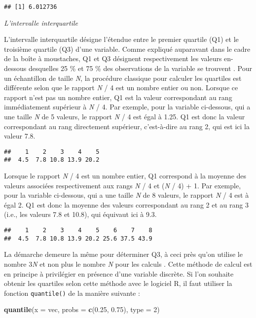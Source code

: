 \documentclass[
  french,
]{book}
\newenvironment{Shaded}{\begin{snugshade}}{\end{snugshade}}
\newcommand{\DataTypeTok}[1]{\textcolor[rgb]{0.13,0.29,0.53}{#1}}
\newcommand{\DecValTok}[1]{\textcolor[rgb]{0.00,0.00,0.81}{#1}}
\newcommand{\FloatTok}[1]{\textcolor[rgb]{0.00,0.00,0.81}{#1}}
\newcommand{\KeywordTok}[1]{\textcolor[rgb]{0.13,0.29,0.53}{\textbf{#1}}}
\newcommand{\NormalTok}[1]{#1}
\begin{document}
\begin{verbatim}
## [1] 6.012736
\end{verbatim}

\emph{L'intervalle interquartile}

L'intervalle interquartile désigne l'étendue entre le premier quartile (Q1) et le troisième quartile (Q3) d'une variable. Comme expliqué auparavant dans le cadre de la boîte à moustaches, Q1 et Q3 désignent respectivement les valeurs en-dessous desquelles 25 \% et 75 \% des observations de la variable se trouvent \autocite{chatellierMoyenneMedianeLeurs2003}. Pour un échantillon de taille \emph{N}, la procédure classique pour calculer les quartiles est différente selon que le rapport \emph{N} / 4 est un nombre entier ou non. Lorsque ce rapport n'est pas un nombre entier, Q1 est la valeur correspondant au rang immédiatement supérieur à \emph{N} / 4. Par exemple, pour la variable ci-dessous, qui a une taille \emph{N} de 5 valeurs, le rapport \emph{N} / 4 est égal à 1.25. Q1 est donc la valeur correspondant au rang directement supérieur, c'est-à-dire au rang 2, qui est ici la valeur 7.8.

\begin{verbatim}
##    1    2    3    4    5 
##  4.5  7.8 10.8 13.9 20.2
\end{verbatim}

Lorsque le rapport \emph{N} / 4 est un nombre entier, Q1 correspond à la moyenne des valeurs associées respectivement aux rangs \emph{N} / 4 et (\emph{N} / 4) + 1. Par exemple, pour la variable ci-dessous, qui a une taille \emph{N} de 8 valeurs, le rapport \emph{N} / 4 est à égal 2. Q1 est donc la moyenne des valeurs correspondant au rang 2 et au rang 3 (i.e., les valeurs 7.8 et 10.8), qui équivaut ici à 9.3.

\begin{verbatim}
##    1    2    3    4    5    6    7    8 
##  4.5  7.8 10.8 13.9 20.2 25.6 37.5 43.9
\end{verbatim}

La démarche demeure la même pour déterminer Q3, à ceci près qu'on utilise le nombre 3\emph{N} et non plus le nombre \emph{N} pour les calculs \autocite{labreucheDifferentsTypesVariables2010}. Cette méthode de calcul est en principe à privilégier en présence d'une variable discrète. Si l'on souhaite obtenir les quartiles selon cette méthode avec le logiciel R, il faut utiliser la fonction \texttt{quantile()} de la manière suivante :

\begin{Shaded}
\begin{Highlighting}[]
\KeywordTok{quantile}\NormalTok{(}\DataTypeTok{x =}\NormalTok{ vec, }\DataTypeTok{probs =} \KeywordTok{c}\NormalTok{(}\FloatTok{0.25}\NormalTok{, }\FloatTok{0.75}\NormalTok{), }\DataTypeTok{type =} \DecValTok{2}\NormalTok{)}
\end{Highlighting}
\end{Shaded}
\end{document}
